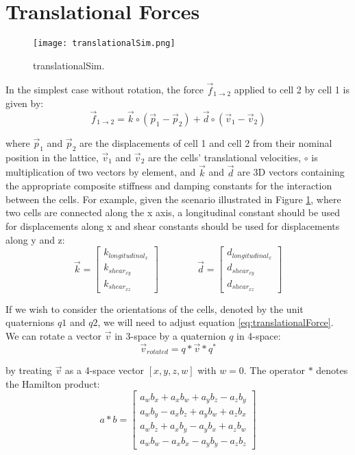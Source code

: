 {\section{Translational Forces}

\begin{figure}
  \texttt{[image: translationalSim.png]}
  \caption{translationalSim.}
  \label{fig:translationalSim}
\end{figure}

In the simplest case without rotation, the force $\vec{f}_{1 \rightarrow 2}$ applied to cell 2 by cell 1 is given by:
\begin{equation} \label{eq:translationalForce}
\vec{f}_{1\rightarrow2} = \vec{k} \circ (\vec{p}_1 - \vec{p}_2) + \vec{d} \circ (\vec{v}_1 - \vec{v}_2)
\end{equation}

where $\vec{p}_1$ and $\vec{p}_2$ are the displacements of cell 1 and cell 2 from their nominal position in the lattice, $\vec{v}_1$ and $\vec{v}_2$ are the cells' translational velocities, $\circ$ is multiplication of two vectors by element, and $\vec{k}$ and $\vec{d}$ are 3D vectors containing the appropriate composite stiffness and damping constants for the interaction between the cells.  For example, given the scenario illustrated in Figure \ref{fig:translationalSim}, where two cells are connected along the x axis, a longitudinal constant should be used for displacements along x and shear constants should be used for displacements along y and z:
\[ \vec{k} =  \left[ \begin{array}{ccc}
k_{longitudinal_x}\\
k_{shear_{xy}}\\
k_{shear_{xz}}
 \end{array} \right]  
  \qquad\qquad
  \vec{d} =  \left[ \begin{array}{ccc}
d_{longitudinal_x}\\
d_{shear_{xy}}\\
d_{shear_{xz}}
 \end{array} \right] \] 
 
If we wish to consider the orientations of the cells, denoted by the unit quaternions $q1$ and $q2$, we will need to adjust equation \ref{eq:translationalForce}. \\
  
  We can rotate a vector $\vec{v}$ in 3-space by a quaternion $q$ in 4-space:
    \[ \vec{v}_{rotated} = q*\vec{v}*q^* \]
  
  by treating $\vec{v}$ as a 4-space vector $[x, y, z, w]$ with $w=0$.  The operator $*$ denotes the Hamilton product:
  \[ a*b =  \left[ \begin{array}{ccc}
a_wb_x + a_xb_w + a_yb_z - a_zb_y\\
a_wb_y - a_xb_z + a_yb_w + a_zb_x\\
a_wb_z + a_xb_y - a_yb_x + a_zb_w\\
a_wb_w - a_xb_x - a_yb_y - a_zb_z
 \end{array} \right] \] 
 
}
